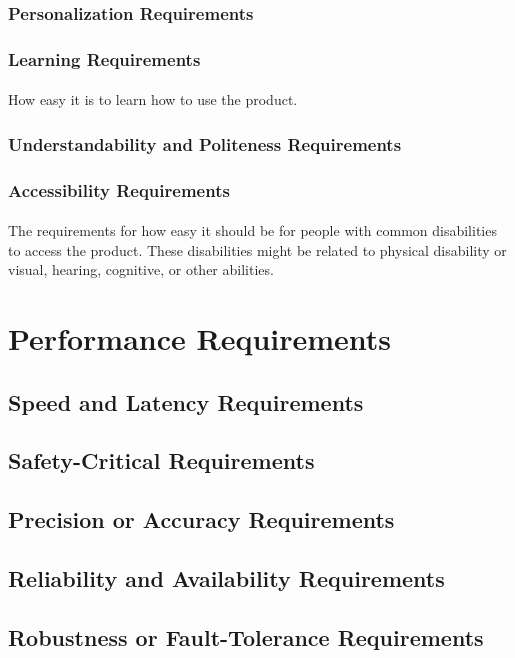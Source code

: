 \documentclass[12pt,a4paper]{article}
\begin{document}
\subsubsection{Personalization Requirements}
\subsubsection{Learning Requirements}
\paragraph{}
How easy it is to learn how to use the product.
\subsubsection{Understandability and Politeness Requirements}
\subsubsection{Accessibility Requirements}
\paragraph{}
The requirements for how easy it should be for people with common disabilities to access the product. These disabilities might be related to physical disability or visual, hearing, cognitive, or other abilities.
\pagebreak
\section{Performance Requirements}
\subsection{Speed and Latency Requirements}
\subsection{Safety-Critical Requirements}
\subsection{Precision or Accuracy Requirements}
\subsection{Reliability and Availability Requirements}
\subsection{Robustness or Fault-Tolerance Requirements}
\end{document}
